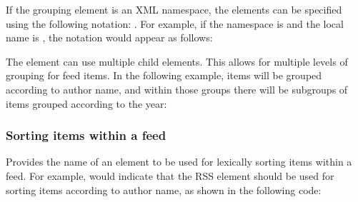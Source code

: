 \documentclass[letterpaper,12pt,english,openany,oneside]{sphinxmanual}
\begin{document}
If the grouping element is an XML namespace, the elements can be specified using the following notation: . For example, if the namespace is  and the local name is , the notation would appear as follows:

\begin{sphinxVerbatim}[commandchars=\\\{\}]
\end{sphinxVerbatim}

The  element can use multiple child  elements. This allows for multiple levels of grouping for feed items. In the following example, items will be grouped according to author name, and within those groups there will be subgroups of items grouped according to the year:

\begin{sphinxVerbatim}[commandchars=\\\{\}]
\end{sphinxVerbatim}


\subsubsection{Sorting items within a feed}
\label{\detokenize{Tracker_InboxAPI:sorting-items-within-a-feed}}
\begin{sphinxVerbatim}[commandchars=\\\{\}]
\end{sphinxVerbatim}

Provides the name of an element to be used for lexically sorting items within a feed. For example,  would indicate that the RSS  element should be used for sorting items according to author name, as shown in the following code:
\end{document}
